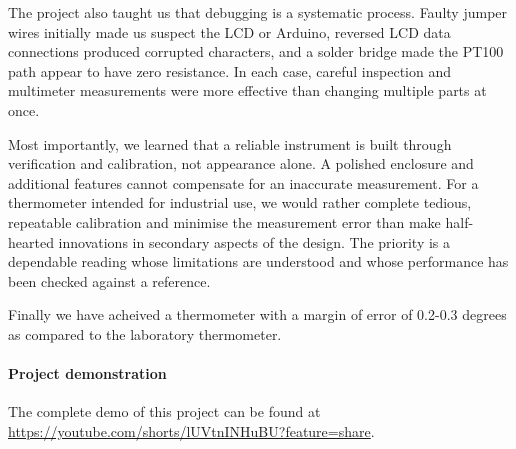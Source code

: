 \documentclass[12pt,a4paper]{article}
\begin{document}
The project also taught us that debugging is a systematic process.
Faulty jumper wires initially made us suspect the LCD or Arduino, reversed
LCD data connections produced corrupted characters, and a solder bridge
made the PT100 path appear to have zero resistance. In each case, careful
inspection and multimeter measurements were more effective than changing
multiple parts at once.

Most importantly, we learned that a reliable instrument is built through
verification and calibration, not appearance alone. A polished enclosure
and additional features cannot compensate for an inaccurate measurement.
For a thermometer intended for industrial use, we would rather complete
tedious, repeatable calibration and minimise the measurement error than
make half-hearted innovations in secondary aspects of the design. The
priority is a dependable reading whose limitations are understood and
whose performance has been checked against a reference.

Finally we have acheived a thermometer with a margin of error of 0.2-0.3 degrees as compared to the laboratory thermometer.

\paragraph{Project demonstration}
The complete demo of this project can be found at
{\color[RGB]{0, 51, 153}\url{https://youtube.com/shorts/lUVtnINHuBU?feature=share}}.
\end{document}
